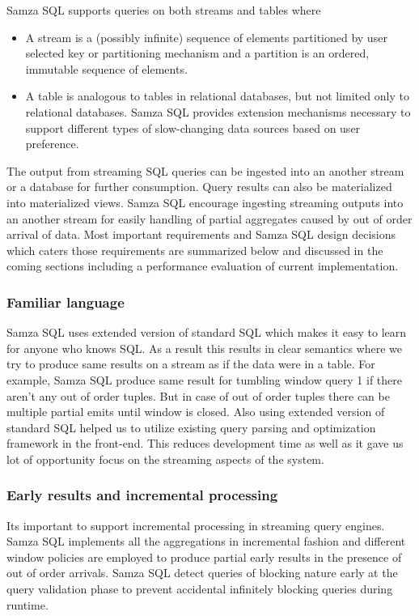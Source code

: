 \documentclass[10pt, conference, compsocconf]{IEEEtran}
\begin{document}
Samza SQL supports queries on both streams and tables where

\begin{itemize}
  \item A stream is a (possibly infinite) sequence of elements partitioned by user selected key or partitioning mechanism and a partition is an ordered, immutable sequence of elements.
  \item A table is analogous to tables in relational databases, but not limited only to relational databases. Samza SQL provides extension mechanisms necessary to support different types of slow-changing data sources based on user preference.
\end{itemize}

The output from streaming SQL queries can be ingested into an another stream or a database for further consumption. Query results can also be materialized into materialized views. Samza SQL encourage ingesting streaming outputs into an another stream for easily handling of partial aggregates caused by out of order arrival of data. Most important requirements and Samza SQL design decisions which caters those requirements are summarized below and discussed in the coming sections including a performance evaluation of current implementation.

\subsubsection{Familiar language}

Samza SQL uses extended version of standard SQL which makes it easy to learn for anyone who knows SQL. As a result this results in clear semantics where we try to produce same results on a stream as if the data were in a table. For example, Samza SQL produce same result for tumbling window query 1 if there aren't any out of order tuples. But in case of out of order tuples there can be multiple partial emits until window is closed. Also using extended version of standard SQL helped us to utilize existing query parsing and optimization framework in the front-end. This reduces development time as well as it gave us lot of opportunity focus on the streaming aspects of the system.

\subsubsection{Early results and incremental processing}

Its important to support incremental processing in streaming query engines. Samza SQL implements all the aggregations in incremental fashion and different window policies are employed to produce partial early results in the presence of out of order arrivals. Samza SQL detect queries of blocking nature early at the query validation phase to prevent accidental infinitely blocking queries during runtime.
\end{document}
